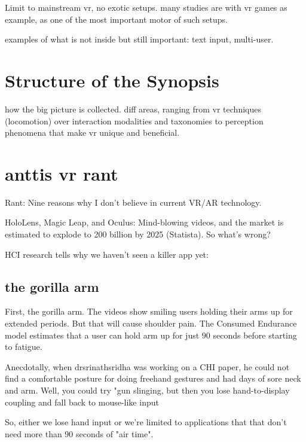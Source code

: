 Limit to mainstream vr, no exotic setups.
many studies are with vr games as example, as one of the most important motor of such setups.


examples of what is not inside but still important: text input, multi-user.




\section{Structure of the Synopsis}

how the big picture is collected. diff areas, ranging from vr techniques (locomotion) over interaction modalities and taxonomies to perception phenomena that make vr unique and beneficial.



\section{anttis vr rant}

Rant: Nine reasons why I don't believe in current VR/AR technology.

HoloLens, Magic Leap, and Oculus: Mind-blowing videos, and the market is estimated to explode to 200 billion by 2025 (Statista). So what's wrong?

HCI research tells why we haven't seen a killer app yet:




\subsection{the gorilla arm}

First, the gorilla arm. The videos show smiling users holding their arms up for extended periods. But that will cause shoulder pain. The Consumed Endurance model estimates that a user can hold arm up for just 90 seconds before starting to fatigue. 

Anecdotally, when drsrinathsridha was working on a CHI paper, he could not find a comfortable posture for doing freehand gestures and had days of sore neck and arm. Well, you could try "gun slinging, but then you lose hand-to-display coupling and fall back to mouse-like input

So, either we lose hand input or we're limited to applications that that don't need more than 90 seconds of "air time". 





